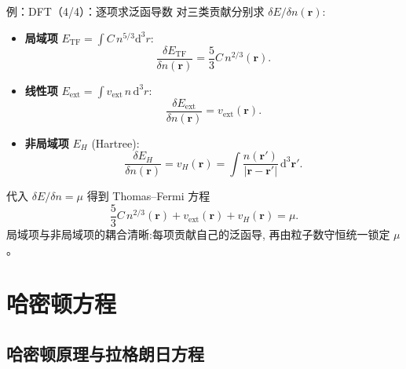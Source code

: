 \documentclass[fontset=windows, chinese, 10pt, xcolor=dvipsnames]{beamer}
\begin{document}
\begin{frame}{例：DFT（4/4）：逐项求泛函导数}
  对三类贡献分别求 $\delta E/\delta n(\mathbf{r})$:
  \begin{itemize}
    \item \textbf{局域项} $E_{\mathrm{TF}}=\int C\,n^{5/3}\mathrm{d}^3r$:
      \begin{equation*}
        \frac{\delta E_{\mathrm{TF}}}{\delta n(\mathbf{r})}
        = \frac{5}{3}C\,n^{2/3}(\mathbf{r}).
      \end{equation*}
    \item \textbf{线性项} $E_{\mathrm{ext}}=\int v_{\mathrm{ext}}\,n\,\mathrm{d}^3r$:
      \begin{equation*}
        \frac{\delta E_{\mathrm{ext}}}{\delta n(\mathbf{r})}
        = v_{\mathrm{ext}}(\mathbf{r}).
      \end{equation*}
    \item \textbf{非局域项} $E_H$ (Hartree):
      \begin{equation*}
        \frac{\delta E_H}{\delta n(\mathbf{r})}
        = v_H(\mathbf{r})
        = \int \frac{n(\mathbf{r}')}{|\mathbf{r}-\mathbf{r}'|}\,\mathrm{d}^3\mathbf{r}'.
      \end{equation*}
  \end{itemize}
  代入 $\delta E/\delta n = \mu$ 得到 Thomas--Fermi 方程
  \begin{equation*}
    \boxed{\frac{5}{3}C\,n^{2/3}(\mathbf{r}) + v_{\mathrm{ext}}(\mathbf{r}) + v_H(\mathbf{r}) = \mu.}
  \end{equation*}
  局域项与非局域项的耦合清晰:每项贡献自己的泛函导,
  再由粒子数守恒统一锁定 $\mu$。
\end{frame}

\section{哈密顿方程}

\subsection{哈密顿原理与拉格朗日方程}
\end{document}
